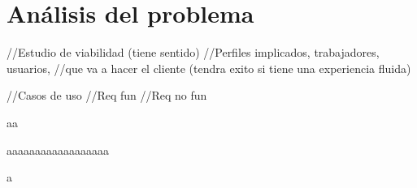 \chapter{Análisis del problema}
 
//Estudio de viabilidad (tiene sentido)
//Perfiles implicados, trabajadores, usuarios, 
//que va a hacer el cliente (tendra exito si tiene una experiencia fluida)

//Casos de uso
//Req fun
//Req no fun

aa

aaaaaaaaaaaaaaaaaa

a
